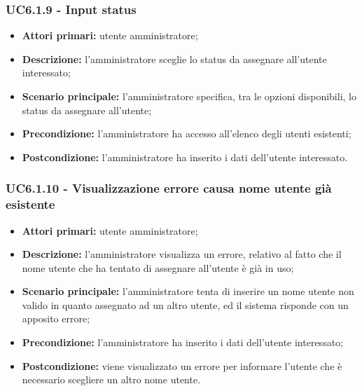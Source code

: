 \subsubsection{UC6.1.9 - Input status}
\begin{itemize}
	\item \textbf{Attori primari:} utente amministratore;
	\item \textbf{Descrizione:} l'amministratore sceglie lo status da assegnare all'utente interessato;
	\item \textbf{Scenario principale:} l'amministratore specifica, tra le opzioni disponibili, lo status da assegnare all'utente;
	\item \textbf{Precondizione:} l'amministratore ha accesso all'elenco degli utenti esistenti;
	\item \textbf{Postcondizione:} l'amministratore ha inserito i dati dell'utente interessato.
\end{itemize}

\subsubsection{UC6.1.10 - Visualizzazione errore causa nome utente già esistente}
	\begin{itemize}
		\item \textbf{Attori primari:} utente amministratore;
		\item \textbf{Descrizione:} l'amministratore visualizza un errore, relativo al fatto che il nome utente che ha tentato di assegnare all'utente è già in uso;
		\item \textbf{Scenario principale:} l'amministratore tenta di inserire un nome utente non valido in quanto assegnato ad un altro utente, ed il sistema risponde con un apposito errore;
		\item \textbf{Precondizione:} l'amministratore ha inserito i dati dell'utente interessato;
		\item \textbf{Postcondizione:} viene visualizzato un errore per informare l'utente che è necessario scegliere un altro nome utente.
	\end{itemize}

